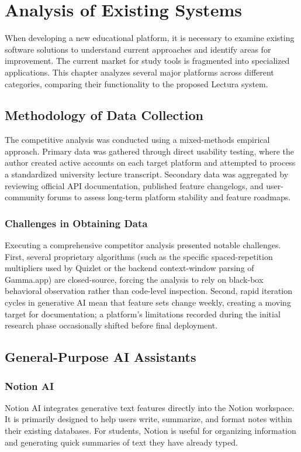 \chapter{Analysis of Existing Systems}
\label{chap:analysis}
\setlength{\parskip}{1em}

When developing a new educational platform, it is necessary to examine existing software solutions to understand current approaches and identify areas for improvement. The current market for study tools is fragmented into specialized applications. This chapter analyzes several major platforms across different categories, comparing their functionality to the proposed Lectura system.

\section{Methodology of Data Collection}
The competitive analysis was conducted using a mixed-methods empirical approach. Primary data was gathered through direct usability testing, where the author created active accounts on each target platform and attempted to process a standardized university lecture transcript. Secondary data was aggregated by reviewing official API documentation, published feature changelogs, and user-community forums to assess long-term platform stability and feature roadmaps. 

\subsection{Challenges in Obtaining Data}
Executing a comprehensive competitor analysis presented notable challenges. First, several proprietary algorithms (such as the specific spaced-repetition multipliers used by Quizlet or the backend context-window parsing of Gamma.app) are closed-source, forcing the analysis to rely on black-box behavioral observation rather than code-level inspection. Second, rapid iteration cycles in generative AI mean that feature sets change weekly, creating a moving target for documentation; a platform's limitations recorded during the initial research phase occasionally shifted before final deployment.

\section{General-Purpose AI Assistants}

\subsection{Notion AI}
Notion AI integrates generative text features directly into the Notion workspace. It is primarily designed to help users write, summarize, and format notes within their existing databases. For students, Notion is useful for organizing information and generating quick summaries of text they have already typed.

